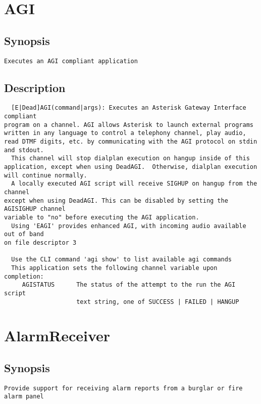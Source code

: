 \section{AGI}
\subsection{Synopsis}
\begin{verbatim}
Executes an AGI compliant application
\end{verbatim}
\subsection{Description}
\begin{verbatim}
  [E|Dead]AGI(command|args): Executes an Asterisk Gateway Interface compliant
program on a channel. AGI allows Asterisk to launch external programs
written in any language to control a telephony channel, play audio,
read DTMF digits, etc. by communicating with the AGI protocol on stdin
and stdout.
  This channel will stop dialplan execution on hangup inside of this
application, except when using DeadAGI.  Otherwise, dialplan execution
will continue normally.
  A locally executed AGI script will receive SIGHUP on hangup from the channel
except when using DeadAGI. This can be disabled by setting the AGISIGHUP channel
variable to "no" before executing the AGI application.
  Using 'EAGI' provides enhanced AGI, with incoming audio available out of band
on file descriptor 3

  Use the CLI command 'agi show' to list available agi commands
  This application sets the following channel variable upon completion:
     AGISTATUS      The status of the attempt to the run the AGI script
                    text string, one of SUCCESS | FAILED | HANGUP

\end{verbatim}


\section{AlarmReceiver}
\subsection{Synopsis}
\begin{verbatim}
Provide support for receiving alarm reports from a burglar or fire alarm panel
\end{verbatim}
